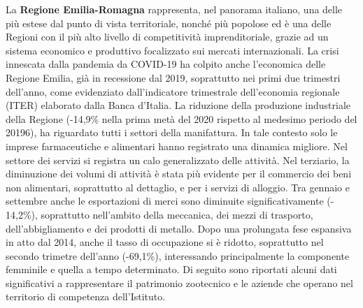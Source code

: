 \documentclass[
  12pt,
]{article}
\begin{document}
La \textbf{Regione Emilia-Romagna} rappresenta, nel panorama italiano,
una delle più estese dal punto di vista territoriale, nonché più
popolose ed è una delle Regioni con il più alto livello di competitività
imprenditoriale, grazie ad un sistema economico e produttivo focalizzato
sui mercati internazionali. La crisi innescata dalla pandemia da
COVID-19 ha colpito anche l'economica delle Regione Emilia, già in
recessione dal 2019, soprattutto nei primi due trimestri dell'anno, come
evidenziato dall'indicatore trimestrale dell'economia regionale (ITER)
elaborato dalla Banca d'Italia. La riduzione della produzione
industriale della Regione (-14,9\% nella prima metà del 2020 rispetto al
medesimo periodo del 20196), ha riguardato tutti i settori della
manifattura. In tale contesto solo le imprese farmaceutiche e alimentari
hanno registrato una dinamica migliore. Nel settore dei servizi si
registra un calo generalizzato delle attività. Nel terziario, la
diminuzione dei volumi di attività è stata più evidente per il commercio
dei beni non alimentari, soprattutto al dettaglio, e per i servizi di
alloggio. Tra gennaio e settembre anche le esportazioni di merci sono
diminuite significativamente (- 14,2\%), soprattutto nell'ambito della
meccanica, dei mezzi di trasporto, dell'abbigliamento e dei prodotti di
metallo. Dopo una prolungata fese espansiva in atto dal 2014, anche il
tasso di occupazione si è ridotto, soprattutto nel secondo trimetre
dell'anno (-69,1\%), interessando principalmente la componente femminile
e quella a tempo determinato. Di seguito sono riportati alcuni dati
significativi a rappresentare il patrimonio zootecnico e le aziende che
operano nel territorio di competenza dell'Istituto.
\end{document}
